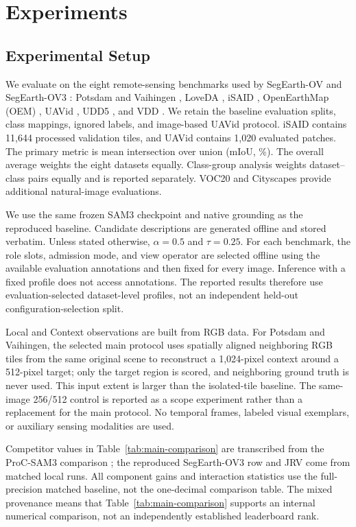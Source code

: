 \section{Experiments}
\label{sec:experiments}

\subsection{Experimental Setup}

We evaluate on the eight remote-sensing benchmarks used by SegEarth-OV and SegEarth-OV3 \cite{R06,R11}: Potsdam and Vaihingen \cite{R42}, LoveDA \cite{R36}, iSAID \cite{R37}, OpenEarthMap (OEM) \cite{R38}, UAVid \cite{R39}, UDD5 \cite{R40}, and VDD \cite{R41}. We retain the baseline evaluation splits, class mappings, ignored labels, and image-based UAVid protocol. iSAID contains 11,644 processed validation tiles, and UAVid contains 1,020 evaluated patches. The primary metric is mean intersection over union (mIoU, \%). The overall average weights the eight datasets equally. Class-group analysis weights dataset--class pairs equally and is reported separately. VOC20 \cite{R44} and Cityscapes \cite{R43} provide additional natural-image evaluations.

We use the same frozen SAM3 checkpoint and native grounding as the reproduced baseline. Candidate descriptions are generated offline and stored verbatim. Unless stated otherwise, $\alpha=0.5$ and $\tau=0.25$. For each benchmark, the role slots, admission mode, and view operator are selected offline using the available evaluation annotations and then fixed for every image. Inference with a fixed profile does not access annotations. The reported results therefore use evaluation-selected dataset-level profiles, not an independent held-out configuration-selection split.

Local and Context observations are built from RGB data. For Potsdam and Vaihingen, the selected main protocol uses spatially aligned neighboring RGB tiles from the same original scene to reconstruct a 1,024-pixel context around a 512-pixel target; only the target region is scored, and neighboring ground truth is never used. This input extent is larger than the isolated-tile baseline. The same-image 256/512 control is reported as a scope experiment rather than a replacement for the main protocol. No temporal frames, labeled visual exemplars, or auxiliary sensing modalities are used.

Competitor values in Table~\ref{tab:main-comparison} are transcribed from the ProC-SAM3 comparison \cite{R12}; the reproduced SegEarth-OV3 row and JRV come from matched local runs. All component gains and interaction statistics use the full-precision matched baseline, not the one-decimal comparison table. The mixed provenance means that Table~\ref{tab:main-comparison} supports an internal numerical comparison, not an independently established leaderboard rank.



